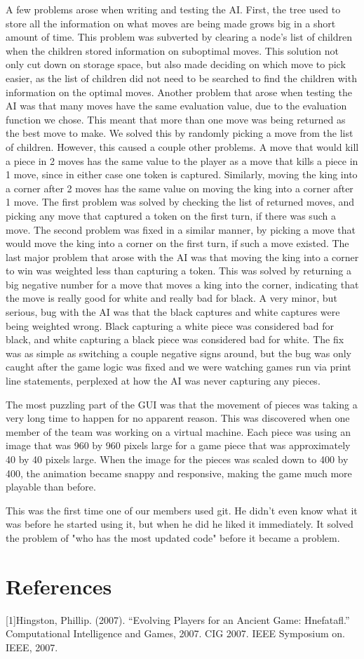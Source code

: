 \documentclass{article}
\begin{document}
	A few problems arose when writing and testing the AI. First, the tree used to store all the information on what moves are being made grows big in a short amount of time. This problem was subverted by clearing a node's list of children when the children stored information on suboptimal moves. This solution not only cut down on storage space, but also made deciding on which move to pick easier, as the list of children did not need to be searched to find the children with information on the optimal moves. Another problem that arose when testing the AI was that many moves have the same evaluation value, due to the evaluation function we chose. This meant that more than one move was being returned as the best move to make. We solved this by randomly picking a move from the list of children. However, this caused a couple other problems. A move that would kill a piece in 2 moves has the same value to the player as a move that kills a piece in 1 move, since in either case one token is captured. Similarly, moving the king into a corner after 2 moves has the same value on moving the king into a corner after 1 move. The first problem was solved by checking the list of returned moves, and picking any move that captured a token on the first turn, if there was such a move. The second problem was fixed in a similar manner, by picking a move that would move the king into a corner on the first turn, if such a move existed. The last major problem that arose with the AI was that moving the king into a corner to win was weighted less than capturing a token. This was solved by returning a big negative number for a move that moves a king into the corner, indicating that the move is really good for white and really bad for black. A very minor, but serious, bug with the AI was that the black captures and white captures were being weighted wrong. Black capturing a white piece was considered bad for black, and white capturing a black piece was considered bad for white. The fix was as simple as switching a couple negative signs around, but the bug was only caught after the game logic was fixed and we were watching games run via print line statements, perplexed at how the AI was never capturing any pieces.\par
	The most puzzling part of the GUI was that the movement of pieces was taking a very long time to happen for no apparent reason. This was discovered when one member of the team was working on a virtual machine. Each piece was using an image that was 960 by 960 pixels large for a game piece that was approximately 40 by 40 pixels large. When the image for the pieces was scaled down to 400 by 400, the animation became snappy and responsive, making the game much more playable than before. \par
	This was the first time one of our members used git. He didn't even know what it was before he started using it, but when he did he liked it immediately. It solved the problem of "who has the most updated code" before it became a problem. 

\section{References}
[1]Hingston, Phillip. (2007). “Evolving Players for an Ancient Game: Hnefatafl.” Computational Intelligence and Games, 2007. CIG 2007. IEEE Symposium on. IEEE, 2007.
\end{document}
